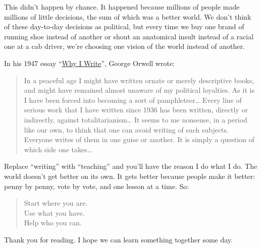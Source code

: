 This didn't happen by chance. It happened because millions of people
made millions of little decisions, the sum of which was a better world.
We don't think of these day-to-day decisions as political, but every
time we buy one brand of running shoe instead of another or shout an
anatomical insult instead of a racial one at a cab driver, we're
choosing one vision of the world instead of another.

In his 1947 essay ``\href{http://www.resort.com/~prime8/Orwell/whywrite.html}{Why I Write}'', George Orwell wrote:

\begin{quote}

In a peaceful age I might have written ornate or merely descriptive
books, and might have remained almost unaware of my political
loyalties. As it is I have been forced into becoming a sort of
pamphleteer\ldots{} Every line of serious work that I have
written since 1936 has been written, directly or indirectly, against
totalitarianism\ldots{} It seems to me nonsense, in a period
like our own, to think that one can avoid writing of such subjects.
Everyone writes of them in one guise or another. It is simply a
question of which side one takes\ldots{}

\end{quote}

Replace ``writing'' with ``teaching'' and you'll have the reason I do what I
do. The world doesn't get better on its own. It gets better because
people make it better: penny by penny, vote by vote, and one lesson at a
time. So:

\begin{quote}

Start where you are.\\
Use what you have.\\
Help who you can.

\end{quote}

Thank you for reading. I hope we can learn something together some day.

